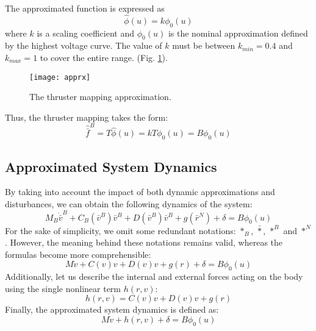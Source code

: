     The approximated function is expressed as 
    \begin{equation}
        \hat{\phi}(u) = k\phi_0(u)   
    \end{equation}
    where $k$ is a scaling coefficient and $\phi_0(u)$ is the nominal 
    approximation defined by the highest voltage curve. 
    The value of $k$ must be between $k_{min} = 0.4$ and $k_{max} = 1$ to cover the 
    entire range.
    (Fig. \ref{image:thrust_apprx}).
    \begin{figure}[H]
        \centering\texttt{[image: apprx]}
        \caption{The thruster mapping approximation.}
        \label{image:thrust_apprx}
    \end{figure}
    
    Thus, the thruster mapping takes the form:
    \begin{equation}
        \hat{\bar{f}}^B=T\hat{\phi}(u) = kT\phi_0(u) = B\phi_0(u)
    \end{equation}

    \subsection{Approximated System Dynamics}
    By taking into account the impact of both dynamic approximations 
    and disturbances, we can obtain the following dynamics of the 
    system:
    \begin{equation}
        M_B \dot{\bar{v}}^B + C_B(\bar{v}^B) \bar{v}^B+D(\bar{v}^B) \bar{v}^B+g(\bar{r}^N)
         + \delta = B\phi_0(u)
    \end{equation}
    For the sake of simplicity, we omit some redundant notations: $*_B$, $\bar *$, $*^B$ and $*^N$. 
    However, the meaning behind these notations remains valid, 
    whereas the formulas become more comprehensible:
    \begin{equation}
        M \dot{v} + C(v)v + D(v)v + g(r) + \delta = B\phi_0(u)
    \end{equation}
    Additionally, let us describe the internal and external forces acting on the 
    body using the single nonlinear term $h(r,v)$:
    \begin{equation}
        h(r,v) = C(v)v + D(v)v + g(r)
    \end{equation}
    Finally, the approximated system dynamics is defined as:
    \begin{equation}
        M \dot{v} + h(r, v) + \delta = B\phi_0(u)
        \label{eqn::apprx_dynamics}
    \end{equation}


